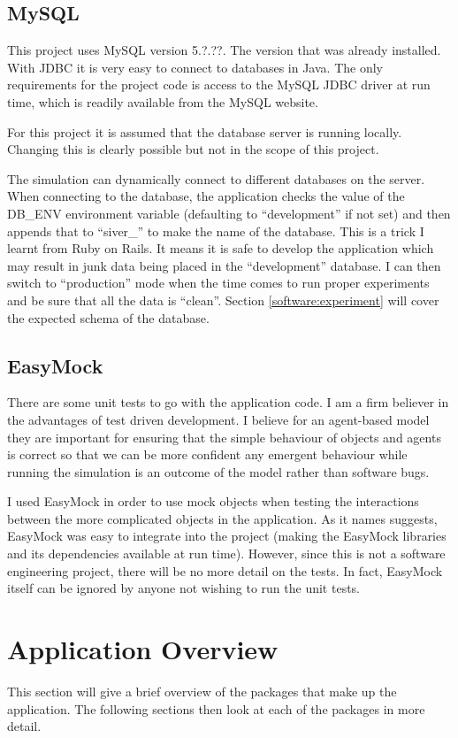   \subsection{MySQL}
  This project uses MySQL version 5.?.??. The version that was already
  installed. With JDBC it is very easy to connect to databases in
  Java. The only requirements for the project code is access to the
  MySQL JDBC driver at run time, which is readily available from the
  MySQL website. 

  For this project it is assumed that the database server is running locally. Changing
  this is clearly possible but not in the scope of this project.

  The simulation can dynamically connect to different databases on the server. When connecting to the
  database, the application checks the value of the DB\_ENV
  environment variable (defaulting to ``development'' if not set) and then appends that to ``siver\_'' to make the
  name of the database. This is a trick I learnt from Ruby on
  Rails. It means it is safe to develop the application which may result
  in junk data being placed in the ``development'' database. I can then switch to ``production'' mode when the
  time comes to run proper experiments and be sure that
  all the data is ``clean''. Section \ref{software:experiment} will
  cover the expected schema of the database.


  \subsection{EasyMock}
  There are some unit tests to go with the application code. I am a
  firm believer in the advantages of test driven development. I
  believe for an agent-based model they are important for ensuring
  that the simple behaviour of objects and agents is correct so that
  we can be more confident any emergent behaviour while running the
  simulation is an outcome of the model rather than software
  bugs.

  I used EasyMock in order to use mock objects when testing the
  interactions between the more complicated objects in the
  application. As it names suggests, EasyMock was easy to integrate
  into the project (making the EasyMock libraries and its dependencies
  available at run time). However, since this is not a software
  engineering project, there will be no more detail on the tests. In
  fact, EasyMock itself can be ignored by anyone not wishing to run
  the unit tests.

\section{Application Overview}
This section will give a brief overview of the packages that make up
the application. The following sections then look at each of the
packages in more detail. 

